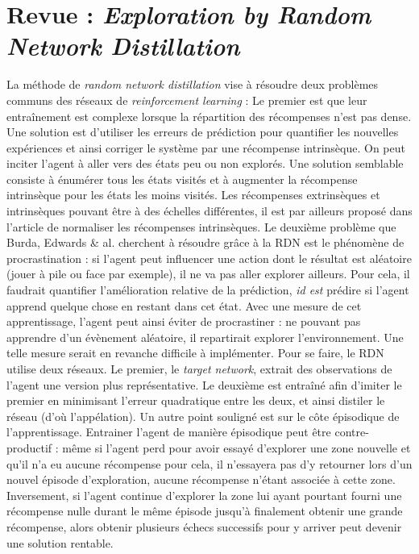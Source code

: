 \documentclass[a4paper,12pt]{report}
\begin{document}
\newpage \section{Revue : \textit{Exploration by Random Network Distillation} \cite{distillation}}
\label{revue_distillation}
\indent La méthode de \textit{random network distillation} vise à résoudre deux problèmes communs des réseaux de \textit{reinforcement learning} :
\newline \indent Le premier est que leur entraînement est complexe lorsque la répartition des récompenses n'est pas dense.
\newline Une solution est d’utiliser les erreurs de prédiction pour quantifier les nouvelles expériences et ainsi corriger le système par une récompense intrinsèque. On peut inciter l’agent à aller vers des états peu ou non explorés. Une solution semblable consiste à énumérer tous les états visités et à augmenter la récompense intrinsèque pour les états les moins visités. Les récompenses extrinsèques et intrinsèques pouvant être à des échelles différentes, il est par ailleurs proposé dans l'article de normaliser les récompenses intrinsèques.
\newline \indent  Le deuxième problème que Burda, Edwards \& al. cherchent à résoudre grâce à la RDN est le phénomène de procrastination : si l’agent peut influencer une action dont le résultat est aléatoire (jouer à pile ou face par exemple), il ne va pas aller explorer ailleurs.
\newline Pour cela, il faudrait quantifier l’amélioration relative de la prédiction, \textit{id est} prédire si l’agent apprend quelque chose en restant dans cet état. Avec une mesure de cet apprentissage, l'agent peut ainsi éviter de procrastiner : ne pouvant pas apprendre d'un évènement aléatoire, il repartirait explorer l'environnement. Une telle mesure serait en revanche difficile à implémenter.
\newline \indent  Pour se faire, le RDN utilise deux réseaux. Le premier, le \textit{target network}, extrait des observations de l’agent une version plus représentative. Le deuxième est entraîné afin d’imiter le premier en minimisant l’erreur quadratique entre les deux, et ainsi distiler le réseau (d'où l'appélation).
\newline
\newline \indent Un autre point souligné est sur le côte épisodique de l'apprentissage. Entrainer l’agent de manière épisodique peut être contre-productif : même si l’agent perd pour avoir essayé d’explorer une zone nouvelle et qu’il n’a eu aucune récompense pour cela, il n'essayera pas d'y retourner lors d'un nouvel épisode d'exploration, aucune récompense n'étant associée à cette zone. Inversement, si l'agent continue d'explorer la zone lui ayant pourtant fourni une récompense nulle durant le même épisode jusqu'à finalement obtenir une grande récompense, alors obtenir plusieurs échecs successifs pour y arriver peut devenir une solution rentable.
\end{document}
